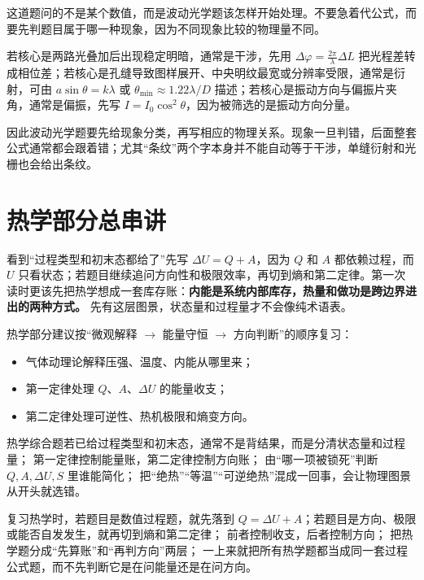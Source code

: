 \documentclass[lang=cn,11pt]{elegantbook}
\newcommand{\bridge}[1]{\begin{note}#1\end{note}}
\begin{document}
\begin{solution}
这道题问的不是某个数值，而是波动光学题该怎样开始处理。不要急着代公式，而要先判题目属于哪一种现象，因为不同现象比较的物理量不同。

若核心是两路光叠加后出现稳定明暗，通常是干涉，先用 \(\Delta\varphi=\frac{2\pi}{\lambda}\Delta L\) 把光程差转成相位差；若核心是孔缝导致图样展开、中央明纹最宽或分辨率受限，通常是衍射，可由 \(a\sin\theta=k\lambda\) 或 \(\theta_{\min}\approx1.22\lambda/D\) 描述；若核心是振动方向与偏振片夹角，通常是偏振，先写 \(I=I_0\cos^2\theta\)，因为被筛选的是振动方向分量。

因此波动光学题要先给现象分类，再写相应的物理关系。现象一旦判错，后面整套公式通常都会跟着错；尤其“条纹”两个字本身并不能自动等于干涉，单缝衍射和光栅也会给出条纹。
\end{solution}

\section{热学部分总串讲}

\bridge{看到“过程类型和初末态都给了”先写 \(\Delta U=Q+A\)，因为 \(Q\) 和 \(A\) 都依赖过程，而 \(U\) 只看状态；若题目继续追问方向性和极限效率，再切到熵和第二定律。第一次读时更该先把热学想成一套库存账：\textbf{内能是系统内部库存，热量和做功是跨边界进出的两种方式。} 先有这层图景，状态量和过程量才不会像纯术语表。}

热学部分建议按“微观解释 \(\rightarrow\) 能量守恒 \(\rightarrow\) 方向判断”的顺序复习：
\begin{itemize}
 \item 气体动理论解释压强、温度、内能从哪里来；
 \item 第一定律处理 \(Q\)、\(A\)、\(\Delta U\) 的能量收支；
 \item 第二定律处理可逆性、热机极限和熵变方向。
\end{itemize}

\begin{note}
 热学综合题若已给过程类型和初末态，通常不是背结果，而是分清状态量和过程量； 第一定律控制能量账，第二定律控制方向账； 由“哪一项被锁死”判断 \(Q,A,\Delta U,S\) 里谁能简化； 把“绝热”“等温”“可逆绝热”混成一回事，会让物理图景从开头就选错。
\end{note}

\begin{note}
 复习热学时，若题目是数值过程题，就先落到 \(Q=\Delta U+A\)；若题目是方向、极限或能否自发发生，就再切到熵和第二定律； 前者控制收支，后者控制方向； 把热学题分成“先算账”和“再判方向”两层； 一上来就把所有热学题都当成同一套过程公式题，而不先判断它是在问能量还是在问方向。
\end{note}
\end{document}
